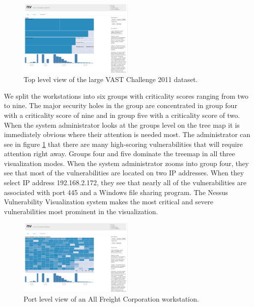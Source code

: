 \documentclass{acm_proc_article-sp}
\begin{document}
\begin{figure}
  \centering
  \includegraphics[width=0.5\textwidth]{../screenshots/final/VastGroup}
  \caption{Top level view of the large VAST Challenge 2011 dataset.}
  \label{VASTTopLevel:fig}
\end{figure}

We split the workstations into six groups with criticality scores ranging from two to
nine. The major security holes in the group are concentrated in group four with a
criticality score of nine and in group five with a criticality score of two.  When the
system administrator looks at the groups level on the tree map it is immediately
obvious where their attention is needed most.
The administrator can see in figure \ref{VASTTopLevel:fig} that there are many high-scoring vulnerabilities that will require attention right away.
Groups four and five dominate the
treemap in all three visualization modes. When the system administrator zooms
into group four, they see that most of the vulnerabilities are located on two IP
addresses. When they select IP address 192.168.2.172, they see that nearly all of
the vulnerabilities are associated with port 445 and a Windows file sharing
program. The Nessus Vulnerability Visualization system makes the most critical and 
severe vulnerabilities most prominent in the visualization.

\begin{figure}
  \centering
  \includegraphics[width=0.5\textwidth]{../screenshots/final/VASTWorkstationPort}
  \caption{Port level view of an All Freight Corporation workstation.}
  \label{VastWorkstationPort:fig}
\end{figure}
\end{document}
